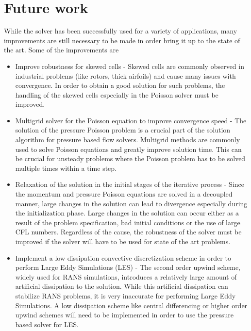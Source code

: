 \section*{Future work}
While the solver has been successfully used for a variety of applications, many improvements are still necessary to be made in order bring it up to the state of the art. Some of the improvements are
\begin{itemize}
\item Improve robustness for skewed cells - Skewed cells are commonly observed in industrial problems (like rotors, thick airfoils) and cause many issues with convergence. In order to obtain a good solution for such problems, the handling of the skewed cells especially in the Poisson solver must be improved.
\item Multigrid solver for the Poisson equation to improve convergence speed - The solution of the pressure Poisson problem is a crucial part of the solution algorithm for pressure based flow solvers. Multigrid methods are commonly used to solve Poisson equations and greatly improve solution time. This can be crucial for unsteady problems where the Poisson problem has to be solved multiple times within a time step.
\item Relaxation of the solution in the initial stages of the iterative process - Since the momentum and pressure Poisson equations are solved in a decoupled manner, large changes in the solution can lead to divergence especially during the initialization phase. Large changes in the solution can occur either as a result of the problem specification, bad initial conditions or the use of large CFL numbers. Regardless of the cause, the robustness of the solver must be improved if the solver will have to be used for state of the art problems.
\item Implement a low dissipation convective discretization scheme in order to perform Large Eddy Simulations (LES) - The second order upwind scheme, widely used for RANS simulations, introduces a relatively large amount of artificial dissipation to the solution. While this artificial dissipation can stabilize RANS problems, it is very inaccurate for performing Large Eddy Simulations. A low dissipation scheme like central differencing or higher order upwind schemes will need to be implemented in order to use the pressure based solver for LES.
\end{itemize}
